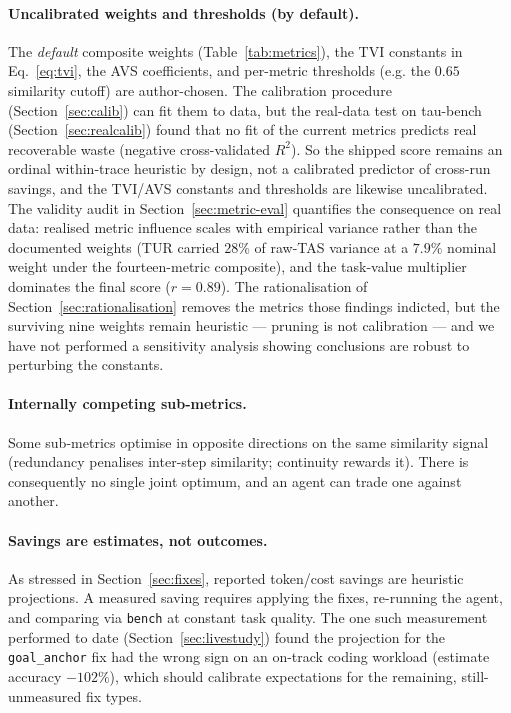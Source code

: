 \documentclass[11pt]{article}
\newcommand{\code}[1]{\texttt{#1}}
\begin{document}
\paragraph{Uncalibrated weights and thresholds (by default).} The \emph{default}
composite weights (Table~\ref{tab:metrics}), the TVI constants in
Eq.~\eqref{eq:tvi}, the AVS coefficients, and per-metric thresholds (e.g. the
$0.65$ similarity cutoff) are author-chosen. The calibration procedure
(Section~\ref{sec:calib}) can fit them to data, but the real-data test on
tau-bench (Section~\ref{sec:realcalib}) found that no fit of the current metrics
predicts real recoverable waste (negative cross-validated $R^2$). So the shipped
score remains an ordinal within-trace heuristic by design, not a calibrated
predictor of cross-run savings, and the TVI/AVS constants and thresholds are
likewise uncalibrated. The validity audit in Section~\ref{sec:metric-eval}
quantifies the consequence on real data: realised metric influence scales with
empirical variance rather than the documented weights (TUR carried $28\%$ of
raw-TAS variance at a $7.9\%$ nominal weight under the fourteen-metric
composite), and the task-value multiplier dominates the final score
($r=0.89$). The rationalisation of Section~\ref{sec:rationalisation} removes
the metrics those findings indicted, but the surviving nine weights remain
heuristic --- pruning is not calibration --- and we have not performed a
sensitivity analysis showing conclusions are robust to perturbing the
constants.

\paragraph{Internally competing sub-metrics.} Some sub-metrics optimise in
opposite directions on the same similarity signal (redundancy penalises
inter-step similarity; continuity rewards it). There is consequently no single
joint optimum, and an agent can trade one against another.

\paragraph{Savings are estimates, not outcomes.} As stressed in
Section~\ref{sec:fixes}, reported token/cost savings are heuristic projections.
A measured saving requires applying the fixes, re-running the agent, and
comparing via \code{bench} at constant task quality. The one such measurement
performed to date (Section~\ref{sec:livestudy}) found the projection for the
\code{goal\_anchor} fix had the wrong sign on an on-track coding workload
(estimate accuracy $-102\%$), which should calibrate expectations for the
remaining, still-unmeasured fix types.
\end{document}
